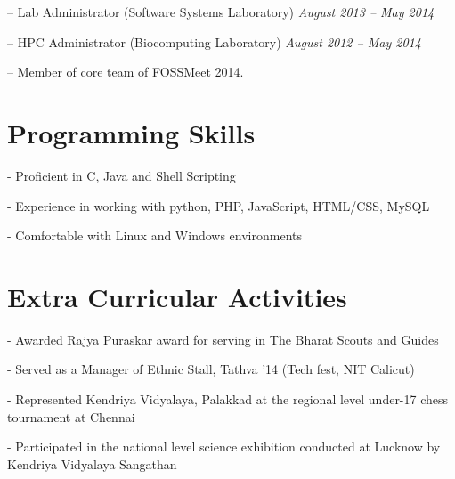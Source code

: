 \documentclass[margin,line]{resume}
\begin{document}
\begin{resume}
	\begin{list2}
	\item[--] Lab Administrator (Software Systems Laboratory) \hfill \textit{August 2013 -- May 2014}
	\item[--] HPC Administrator (Biocomputing Laboratory)  \hfill  \textit{August 2012 -- May 2014}
	\item[--] Member of core team of FOSSMeet 2014.
	\end{list2}

    \section{\mysidestyle Programming Skills} 
    	\begin{list2}
	\item[-] Proficient in C, Java and Shell Scripting
	\item[-] Experience in working with python, PHP, JavaScript, HTML/CSS, MySQL
	\item[-] Comfortable with Linux and Windows environments
	\end{list2}
	
	
	
    \section{\mysidestyle Extra Curricular Activities} 
    	\begin{list2}
	\item[-] Awarded Rajya Puraskar award for serving in The Bharat Scouts and Guides
	\item[-] Served as a Manager of Ethnic Stall, Tathva '14 (Tech fest, NIT Calicut)
	\item[-] Represented Kendriya Vidyalaya, Palakkad at the regional level under-17 chess tournament at Chennai
	\item[-] Participated in the national level science exhibition conducted at Lucknow by Kendriya
Vidyalaya Sangathan
	\end{list2}

\end{resume}
\end{document}
